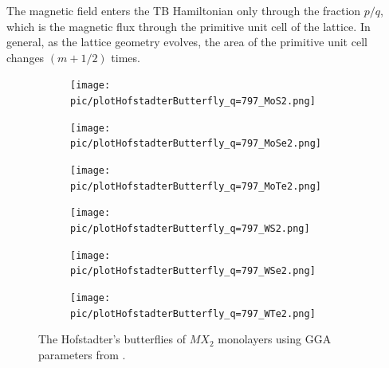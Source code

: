 \documentclass{report}
\begin{document}
The magnetic field enters the TB Hamiltonian only through the fraction $p/q$, which is the magnetic flux through the primitive unit cell of the lattice. In general, as the lattice geometry evolves, the area of the primitive unit cell changes $(m + 1/2)$ times.

\begin{figure}[htb]
	\centering
	\begin{subfigure}[b]{0.32\linewidth}
		\centering
		\texttt{[image: pic/plotHofstadterButterfly\_q=797\_MoS2.png]}
		\label{fig:matt 1}
	\end{subfigure}
	\begin{subfigure}[b]{0.32\linewidth}
		\centering
		\texttt{[image: pic/plotHofstadterButterfly\_q=797\_MoSe2.png]}
		\label{fig:matt 2}
	\end{subfigure}
	\begin{subfigure}[b]{0.32\linewidth}
		\centering
		\texttt{[image: pic/plotHofstadterButterfly\_q=797\_MoTe2.png]}
		\label{fig:matt 3}
	\end{subfigure}
	\begin{subfigure}[b]{0.32\linewidth}
		\centering
		\texttt{[image: pic/plotHofstadterButterfly\_q=797\_WS2.png]}
		\label{fig:matt 4}
	\end{subfigure}
	\begin{subfigure}[b]{0.32\linewidth}
		\centering
		\texttt{[image: pic/plotHofstadterButterfly\_q=797\_WSe2.png]}
		\label{fig:matt 5}
	\end{subfigure}
	\begin{subfigure}[b]{0.32\linewidth}
		\centering
		\texttt{[image: pic/plotHofstadterButterfly\_q=797\_WTe2.png]}
		\label{fig:matt 6}
	\end{subfigure}
	\caption{
		The Hofstadter’s butterflies of $MX_{2}$ monolayers using GGA parameters from \cite{PhysRevB.88.085433}.
	}
\end{figure}
\end{document}

